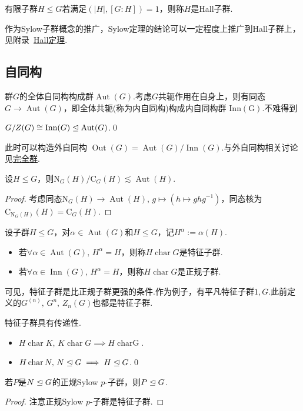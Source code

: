 有限子群$H\le G$若满足$(|H|,[G:H])=1$，则称$H$是{\heiti Hall子群}.

作为Sylow子群概念的推广，Sylow定理的结论可以一定程度上推广到Hall子群上，见附录~\hyperlink{thm:Hall}{Hall定理}.
\subsection{自同构}
群$G$的全体自同构构成群$\operatorname*{Aut}(G)$.考虑$G$共轭作用在自身上，则有同态$G\to\operatorname*{Aut}(G)$，即全体共轭(称为{\heiti 内自同构})构成{\heiti 内自同构群} $\operatorname*{Inn(G)}$.不难得到
\begin{prop}
	$G/Z(G)\cong\operatorname*{Inn}(G)\trianglelefteq\operatorname*{Aut}(G)$.\qed
\end{prop}

此时可以构造{\heiti 外自同构} $\operatorname*{Out}(G)=\operatorname*{Aut}(G)/\operatorname*{Inn}(G)$.与外自同构相关讨论见\hyperlink{subsec:CompleteGrp}{完全群}.

\begin{thm}[(N/C定理)]
	设$H\le G$，则$\mathrm{N}_G(H)/\mathrm{C}_G(H)\lesssim\operatorname*{Aut}(H)$.
\end{thm}
\begin{proof}
	考虑同态$\mathrm{N}_G(H)\to\operatorname*{Aut}(H),\,g\mapsto(h\mapsto ghg^{-1})$，同态核为$\mathrm{C}_{\mathrm{N}_G(H)}(H)=\mathrm{C}_G(H)$.
\end{proof}

\begin{definition}
	设子群$H\le G$，对$\alpha\in\operatorname*{Aut}(G)$和$H\le G$，记$H^\alpha:=\alpha(H)$.
	\begin{itemize}
		\item 若$\forall\alpha\in\operatorname*{Aut}(G),\,H^\alpha=H$，则称$H\operatorname*{char}G$是{\heiti 特征子群}.
		\item 若$\forall\alpha\in\operatorname*{Inn}(G),\,H^\alpha=H$，则称$H\operatorname*{char}G$是{\heiti 正规子群}.
	\end{itemize}
\end{definition}

可见，特征子群是比正规子群更强的条件.作为例子，有平凡特征子群$1,G$.此前定义的$G^{(n)},\,G^n,\,Z_n(G)$也都是特征子群.
\begin{prop}
	特征子群具有传递性.
	\begin{itemize}
		\item $H\operatorname*{char}K,\,K\operatorname*{char} G\implies H\operatorname*{char G}$.
		\item $H\operatorname*{char} N,\,N\trianglelefteq G\implies H\trianglelefteq G$.\qed
	\end{itemize}
\end{prop}
\begin{cor}
	若$P$是$N\trianglelefteq G$的正规Sylow $p$-子群，则$P\trianglelefteq G$.
\end{cor}
\begin{proof}
	注意正规Sylow $p$-子群是特征子群.
\end{proof}

